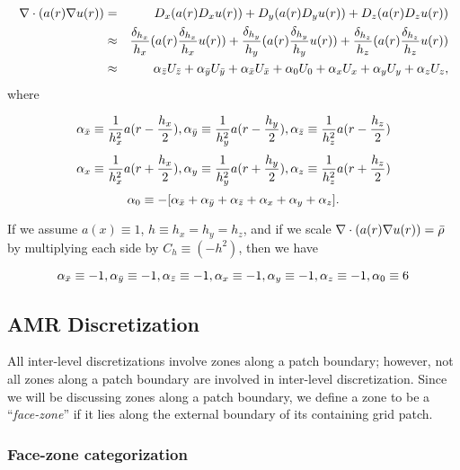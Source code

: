 \documentclass[10pt]{article}
\begin{document}
\begin{center}
\begin{minipage}{1.5in}
\end{minipage} 
\end{center}


 \begin{eqnarray*}
 \nabla\cdot(a(r) \nabla u(r)) & = & D_x (a(r) D_x u(r)) + D_y (a(r) D_y u(r)) + D_z (a(r) D_z u(r)) \\
 & \approx & \frac{\delta_{h_x}}{h_x} (a(r) \frac{\delta_{h_x}}{h_x} u(r)) + 
             \frac{\delta_{h_y}}{h_y} (a(r) \frac{\delta_{h_y}}{h_y} u(r)) + 
             \frac{\delta_{h_z}}{h_z} (a(r) \frac{\delta_{h_z}}{h_z} u(r)) \\
 & \approx & \alpha_{\bar{z}}U_{\bar{z}} +  \alpha_{\bar{y}}U_{\bar{y}} +  \alpha_{\bar{x}}U_{\bar{x}} 
  +  \alpha_{0}U_{0} 
  +  \alpha_{x}U_{x} +  \alpha_{y}U_{y} +  \alpha_{z}U_{z},
 \end{eqnarray*}
where

\[\alpha_{\bar{x}}  \equiv  \frac{1}{h_x^2} a(r-\frac{h_x}{2}),
 \alpha_{\bar{y}}  \equiv  \frac{1}{h_y^2} a(r-\frac{h_y}{2}), 
 \alpha_{\bar{z}}  \equiv  \frac{1}{h_z^2} a(r-\frac{h_z}{2}) \]
 \[\alpha_{x}  \equiv  \frac{1}{h_x^2} a(r+\frac{h_x}{2}), 
 \alpha_{y}  \equiv  \frac{1}{h_y^2} a(r+\frac{h_y}{2}),
 \alpha_{z}  \equiv  \frac{1}{h_z^2} a(r+\frac{h_z}{2}) \]
 \[\alpha_{0}   \equiv  - [\alpha_{\bar{x}} + \alpha_{\bar{y}} + \alpha_{\bar{z}} + \alpha_{x} + \alpha_{y} + \alpha_{z}]. \]

If we assume $a(x)\equiv 1$, $h\equiv h_x = h_y = h_z$, and if we
scale $\nabla\cdot(a(r) \nabla u(r)) = \bar{\rho}$ by multiplying each
side by $C_h \equiv (-h^2)$, then we have

\[\alpha_{\bar{x}}  \equiv  -1,
 \alpha_{\bar{y}}  \equiv  -1,
 \alpha_{\bar{z}}  \equiv  -1,
 \alpha_{x}  \equiv  -1,
 \alpha_{y}  \equiv  -1,
 \alpha_{z}  \equiv  -1,
 \alpha_{0}   \equiv  6 \]

\subsection{AMR Discretization} \label{sss:discret-amr}

All inter-level discretizations involve zones along a patch boundary;
however, not all zones along a patch boundary are involved in
inter-level discretization.  Since we will be discussing zones along a
patch boundary, we define a zone to be a ``\textit{face-zone}'' if it
lies along the external boundary of its containing grid patch.


\subsubsection{Face-zone categorization}
\end{document}
